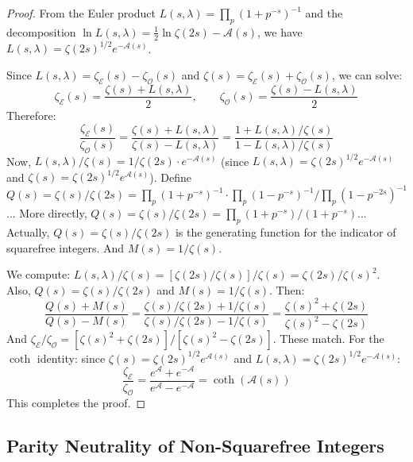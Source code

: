 \documentclass[11pt,a4paper]{article}
\theoremstyle{definition}
\newcommand{\EE}{\mathcal{E}}
\newcommand{\OO}{\mathcal{O}}
\renewcommand{\AA}{\mathcal{A}}
\begin{document}
\begin{proof}
From the Euler product $L(s,\lambda) = \prod_p (1+p^{-s})^{-1}$ and the decomposition $\ln L(s,\lambda) = \frac{1}{2}\ln\zeta(2s) - \AA(s)$, we have $L(s,\lambda) = \zeta(2s)^{1/2} e^{-\AA(s)}$.

Since $L(s,\lambda) = \zeta_{\EE}(s) - \zeta_{\OO}(s)$ and $\zeta(s) = \zeta_{\EE}(s) + \zeta_{\OO}(s)$, we can solve:
\begin{equation}
\zeta_{\EE}(s) = \frac{\zeta(s) + L(s,\lambda)}{2}, \qquad \zeta_{\OO}(s) = \frac{\zeta(s) - L(s,\lambda)}{2}
\end{equation}
Therefore:
\begin{equation}
\frac{\zeta_{\EE}(s)}{\zeta_{\OO}(s)} = \frac{\zeta(s) + L(s,\lambda)}{\zeta(s) - L(s,\lambda)} = \frac{1 + L(s,\lambda)/\zeta(s)}{1 - L(s,\lambda)/\zeta(s)}
\end{equation}
Now, $L(s,\lambda)/\zeta(s) = 1/\zeta(2s) \cdot e^{-\AA(s)}$ (since $L(s,\lambda) = \zeta(2s)^{1/2} e^{-\AA(s)}$ and $\zeta(s) = \zeta(2s)^{1/2} e^{\AA(s)}$). Define $Q(s) = \zeta(s)/\zeta(2s) = \prod_p(1+p^{-s})^{-1} \cdot \prod_p(1-p^{-s})^{-1} / \prod_p(1-p^{-2s})^{-1}$... More directly, $Q(s) = \zeta(s)/\zeta(2s) = \prod_p(1+p^{-s})/(1+p^{-s})$... Actually, $Q(s) = \zeta(s)/\zeta(2s)$ is the generating function for the indicator of squarefree integers. And $M(s) = 1/\zeta(s)$.

We compute: $L(s,\lambda)/\zeta(s) = [\zeta(2s)/\zeta(s)]/\zeta(s) = \zeta(2s)/\zeta(s)^2$. Also, $Q(s) = \zeta(s)/\zeta(2s)$ and $M(s) = 1/\zeta(s)$. Then:
\begin{equation}
\frac{Q(s) + M(s)}{Q(s) - M(s)} = \frac{\zeta(s)/\zeta(2s) + 1/\zeta(s)}{\zeta(s)/\zeta(2s) - 1/\zeta(s)} = \frac{\zeta(s)^2 + \zeta(2s)}{\zeta(s)^2 - \zeta(2s)}
\end{equation}
And $\zeta_{\EE}/\zeta_{\OO} = [\zeta(s)^2 + \zeta(2s)]/[\zeta(s)^2 - \zeta(2s)]$. These match. For the $\coth$ identity: since $\zeta(s) = \zeta(2s)^{1/2} e^{\AA(s)}$ and $L(s,\lambda) = \zeta(2s)^{1/2} e^{-\AA(s)}$:
\begin{equation}
\frac{\zeta_{\EE}}{\zeta_{\OO}} = \frac{e^{\AA} + e^{-\AA}}{e^{\AA} - e^{-\AA}} = \coth(\AA(s))
\end{equation}
This completes the proof.
\end{proof}

\subsection{Parity Neutrality of Non-Squarefree Integers}
\end{document}
